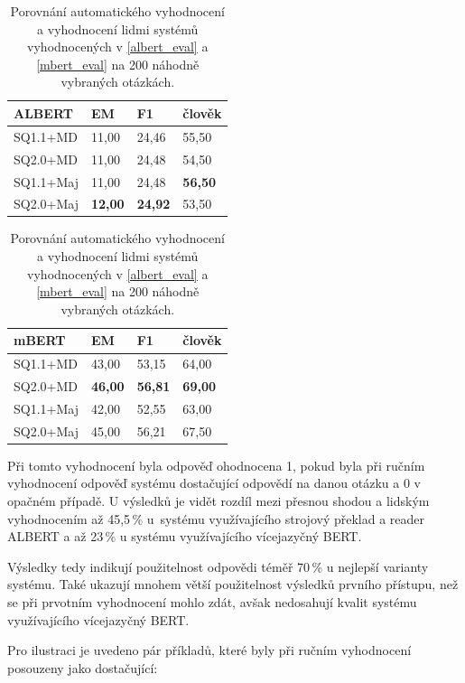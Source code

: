\begin{table}[H]
\centering
\begin{tabular}{|l||l|l|l|}
    \hline
        {ALBERT}       & \textbf{EM} & \textbf{F1} & \textbf{člověk} \\ \hline\hline
    SQ1.1+MD  & 11,00       & 24,46       & 55,50               \\ \hline
    SQ2.0+MD  & 11,00       & 24,48       & 54,50               \\ \hline
    SQ1.1+Maj & 11,00       & 24,48      & \textbf{56,50}               \\ \hline
    SQ2.0+Maj & \textbf{12,00}       & \textbf{24,92}      & 53,50               \\ \hline
    \end{tabular}
    \begin{tabular}{|l||l|l|l|}
    \hline
    {mBERT}       & \textbf{EM} & \textbf{F1} & \textbf{člověk} \\ \hline\hline
    SQ1.1+MD  & 43,00       & 53,15         & 64,00               \\ \hline
    SQ2.0+MD  & \textbf{46,00}& \textbf{56,81}& \textbf{69,00}              \\ \hline
    SQ1.1+Maj & 42,00       & 52,55           & 63,00               \\ \hline
    SQ2.0+Maj & 45,00       & 56,21           & 67,50               \\ \hline
    \end{tabular}
\caption{Porovnání automatického vyhodnocení a vyhodnocení lidmi systémů vyhodnocených v \ref{albert_eval} a \ref{mbert_eval} na 200 náhodně vybraných otázkách.}
\label{tab:human_eval}
\end{table}

Při tomto vyhodnocení byla odpověď ohodnocena 1, pokud byla při ručním vyhodnocení odpověď systému dostačující odpovědí na danou otázku a 0 v opačném případě. U výsledků je vidět rozdíl mezi přesnou shodou a lidským vyhodnocením až 45,5\,\% u~systému využívajícího strojový překlad a reader ALBERT a až 23\,\% u systému využívajícího vícejazyčný BERT.\par
Výsledky tedy indikují použitelnost odpovědi téměř 70\,\% u nejlepší varianty systému. Také ukazují mnohem větší použitelnost výsledků prvního přístupu, než se při prvotním vyhodnocení mohlo zdát, avšak nedosahují kvalit systému využívajícího vícejazyčný BERT.\par
Pro ilustraci je uvedeno pár příkladů, které byly při ručním vyhodnocení posouzeny jako dostačující:

